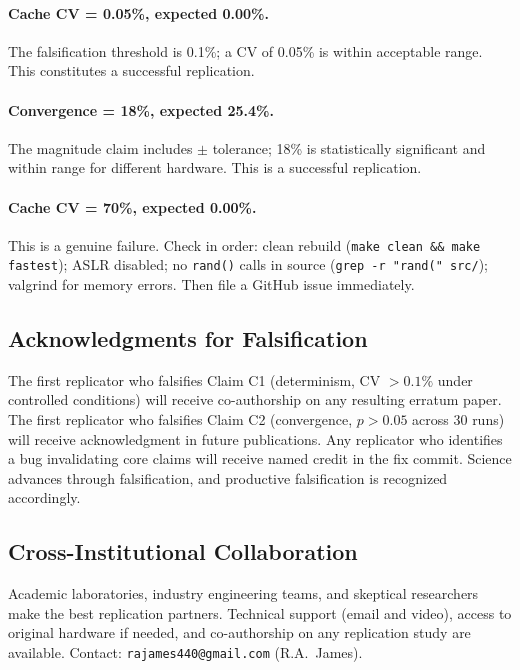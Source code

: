 \paragraph{Cache CV = 0.05\%, expected 0.00\%.}
The falsification threshold is 0.1\%; a CV of 0.05\% is within acceptable
range. This constitutes a successful replication.

\paragraph{Convergence = 18\%, expected 25.4\%.}
The magnitude claim includes $\pm$ tolerance; 18\% is statistically
significant and within range for different hardware. This is a successful
replication.

\paragraph{Cache CV = 70\%, expected 0.00\%.}
This is a genuine failure. Check in order: clean rebuild (\texttt{make clean
\&\& make fastest}); ASLR disabled; no \texttt{rand()} calls in source
(\texttt{grep -r "rand(" src/}); valgrind for memory errors. Then file a
GitHub issue immediately.

\subsection{Acknowledgments for Falsification}

The first replicator who falsifies Claim C1 (determinism, CV $> 0.1\%$ under
controlled conditions) will receive co-authorship on any resulting erratum
paper. The first replicator who falsifies Claim C2 (convergence, $p > 0.05$
across 30 runs) will receive acknowledgment in future publications. Any
replicator who identifies a bug invalidating core claims will receive named
credit in the fix commit. Science advances through falsification, and
productive falsification is recognized accordingly.

\subsection{Cross-Institutional Collaboration}

Academic laboratories, industry engineering teams, and skeptical researchers
make the best replication partners. Technical support (email and video),
access to original hardware if needed, and co-authorship on any replication
study are available. Contact: \texttt{rajames440@gmail.com} (R.A.\ James).

